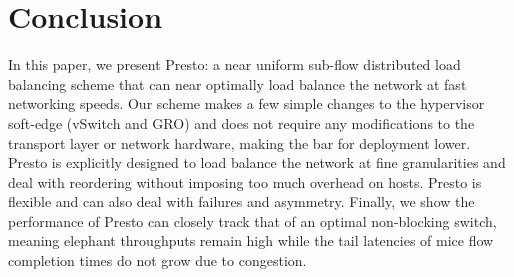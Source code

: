 \section{Conclusion}
\label{sec:conclusion}
In this paper, we present Presto: a near uniform sub-flow distributed load balancing scheme
that can near optimally load balance the network at fast networking speeds.
Our scheme makes a few simple changes to the hypervisor soft-edge (vSwitch and GRO)
and does not require any modifications to the transport layer or network hardware, making
the bar for deployment lower. 
Presto is explicitly designed to load balance the network at fine granularities
and deal with reordering without imposing too much overhead on hosts. Presto is flexible and can also
deal with failures and asymmetry. Finally, we show the performance of Presto can closely track
that of an optimal non-blocking switch, meaning elephant throughputs remain high while the tail
latencies of mice flow completion times do not grow due to congestion.
